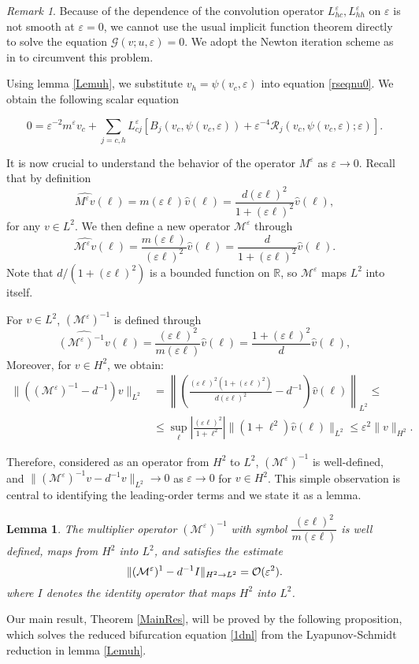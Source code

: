 \documentclass[letterpaper,11pt]{article}
\newcommand{\R}{\mathbb{R}}
\newcommand{\rmO}{\mathcal{O}}
\newcommand{\eps}{\varepsilon}
\newcommand{\Rm}{\mathcal{R}}
\newcommand{\G}{\mathcal{G}}
\newcommand{\M}{\mathcal{M}}
\numberwithin{equation}{section}
\theoremstyle{plain}
\newtheorem{lemma}[theorem]{Lemma}
\theoremstyle{remark}
\newtheorem*{remark}{Remark}
\begin{document}
\begin{remark} Because of the dependence of the convolution operator $L_{hc}^\eps, L_{hh}^\eps$ on $\eps$ is not smooth at $\eps = 0$, we cannot use the usual implicit function theorem directly to solve the equation $\G(v;u,\eps) = 0$. We adopt the Newton iteration scheme as in \citep{faye2013existence} to circumvent this problem.
\end{remark}

Using lemma \ref{Lemuh}, we substitute $v_h = \psi(v_c,\eps)$ into equation \eqref{rseqnu0}. We obtain the following scalar equation

\begin{equation} \label{1dnl}
0 = \eps^{-2}m^\eps v_c + \sum_{j=c,h}L_{cj}^\eps\left[B_j(v_c,\psi(v_c,\eps))+\eps^{-4}\Rm_j(v_c,\psi(v_c,\eps);\eps)\right].
\end{equation}


It is now crucial to understand the behavior of the operator $M^\eps$ as $\eps \to 0$. Recall that by definition
\[
\widehat{M^\eps v}(\ell) = m(\eps \ell)\widehat{v}(\ell) = \frac{d(\eps\ell)^2}{1+(\eps\ell)^2} \widehat{v}(\ell), 
\]
for any $v\in L^2$. We then define a new operator $\mathcal{M}^\eps$ through 
\[ 
\widehat{\mathcal{M}^\eps v}(\ell) = \frac{m(\eps\ell)}{(\eps\ell)^2}\widehat{v}(\ell)=\frac{d}{1+(\eps\ell)^2} \widehat{v}(\ell). 
\] 
Note that $d/(1+(\eps \ell)^2)$ is a bounded function on $\R$, so $\M^\eps$ maps $L^2$ into itself. 

For $v\in L^2$, $(\M^{\eps})^{-1}$ is defined through
\[
\widehat{(\M^{\eps})^{-1}v} (\ell) = \frac{(\eps\ell)^2}{m(\eps\ell)} \widehat{v}(\ell)= \frac{1+(\eps \ell)^2}{d} \widehat{v}(\ell),
\]
Moreover, for $v \in H^2$, we obtain:
\begin{align*}
\|((\M^\eps)^{-1}-d^{-1})v\|_{L^2} &=\left\| \left(\frac{(\eps\ell)^2(1+(\eps\ell)^2)}{d(\eps\ell)^2}-d^{-1}\right)\widehat{v}(\ell)\right\|_{L^2} \le 
\\
& \le \sup_{\ell} \left|\frac{(\eps\ell)^2}{1+\ell^2}\right| \|(1+\ell^2)\widehat{v}(\ell) \|_{L^2} \le \eps^2 \|v\|_{H^2}.
\end{align*}

Therefore, considered as an operator from $H^2$ to $L^2$, $(\M^\eps)^{-1}$ is well-defined, and $\|(\M^{\eps})^{-1}v - d^{-1}v\|_{L^2} \to 0$ as $\eps \to 0$ for $v \in H^2$. This simple observation is central to identifying the leading-order terms and  we state it as a lemma.


\begin{lemma}\label{estmult}The multiplier operator $(\M^\eps)^{-1}$ with symbol $\dfrac{(\eps\ell)^2}{m(\eps\ell)}$ is well defined, maps from $H^2$ into $L^2$, and satisfies the estimate
\[
\|(\M^\eps)^{\-1}-d^{-1}I\|_{H^2 \to L^2} = \rmO(\eps^2).
\]
where $I$ denotes the identity operator that maps $H^2$ into $L^2$.
\end{lemma}
Our main result, Theorem \ref{MainRes}, will be proved by the following proposition, which solves the reduced bifurcation equation \eqref{1dnl} from the Lyapunov-Schmidt reduction in lemma \ref{Lemuh}.
\end{document}
